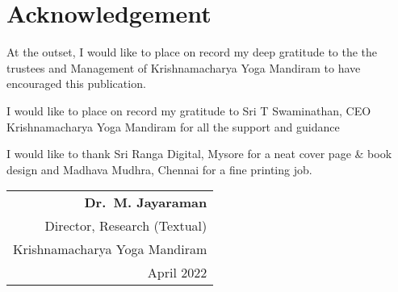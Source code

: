 \thispagestyle{empty}

\chapter*{Acknowledgement}\label{ack}

At the outset, I would like to place on record my deep gratitude to the the trustees and Management of Krishnamacharya Yoga Mandiram to have encouraged this publication.

I would like to place on record my gratitude to Sri T Swaminathan, CEO Krishnamacharya Yoga Mandiram for all the support and guidance

I would like to thank Sri Ranga Digital, Mysore for a neat cover page \& book design and Madhava Mudhra, Chennai for a fine printing job.
\bigskip

\begin{flushright}
	\begin{tabular}{r}
		\textbf{Dr.\ M. Jayaraman}\\
		Director, Research (Textual)\\
		Krishnamacharya Yoga Mandiram \\
		April 2022
	\end{tabular}
\end{flushright}

